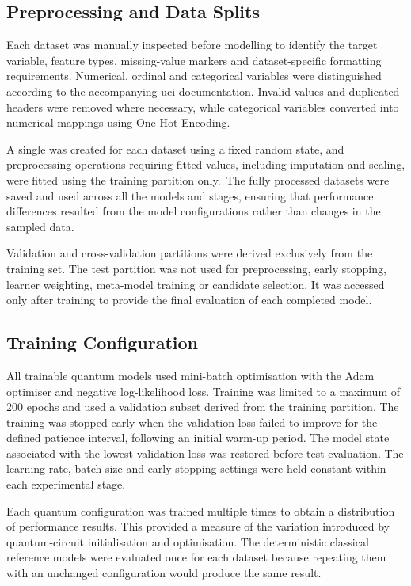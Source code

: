 \documentclass[]{UCD_CS_MSc_AAI_Report}
\begin{document}
\subsection{Preprocessing and Data Splits}

Each dataset was manually inspected before modelling to identify the target variable, feature types, missing-value markers and dataset-specific formatting requirements. Numerical, ordinal and categorical variables were distinguished according to the accompanying \ac{uci} documentation. Invalid values and duplicated headers were removed where necessary, while categorical variables converted into numerical mappings using One Hot Encoding. 

A single  was created for each dataset using a fixed random state, and preprocessing operations requiring fitted values, including imputation and scaling, were fitted using the training partition only. The fully processed datasets were saved and used across all the models and stages, ensuring that performance differences resulted from the model configurations rather than changes in the sampled data.

Validation and cross-validation partitions were derived exclusively from the training set. The test partition was not used for preprocessing, early stopping, learner weighting, meta-model training or candidate selection. It was accessed only after training to provide the final evaluation of each completed model.

\subsection{Training Configuration}
\label{sec:method-training}

All trainable quantum models used mini-batch optimisation with the Adam optimiser and negative log-likelihood loss. Training was limited to a maximum of 200 epochs and used a validation subset derived from the training partition. The training was stopped early when the validation loss failed to improve for the defined patience interval, following an initial warm-up period. The model state associated with the lowest validation loss was restored before test evaluation. The learning rate, batch size and early-stopping settings were held constant within each experimental stage.

Each quantum configuration was trained multiple times to obtain a distribution of performance results. This provided a measure of the variation introduced by quantum-circuit initialisation and optimisation. The deterministic classical reference models were evaluated once for each dataset because repeating them with an unchanged configuration would produce the same result.
\end{document}
